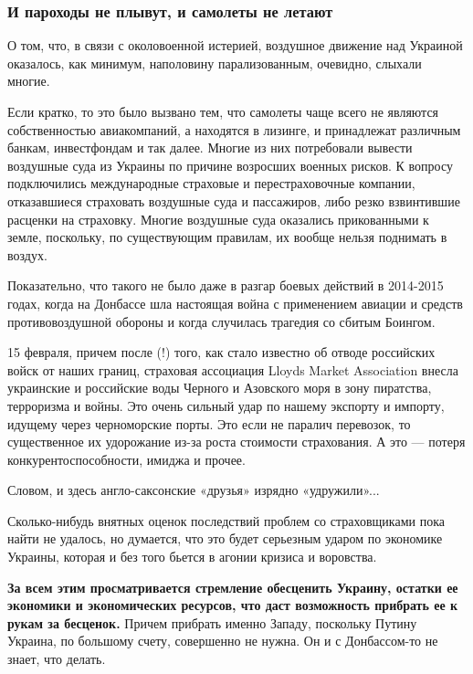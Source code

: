  
 
 
 
 

\subsubsection{И пароходы не плывут, и самолеты не летают}

О том, что, в связи с околовоенной истерией, воздушное движение над Украиной
оказалось, как минимум, наполовину парализованным, очевидно, слыхали многие.

Если кратко, то это было вызвано тем, что самолеты чаще всего не являются
собственностью авиакомпаний, а находятся в лизинге, и принадлежат различным
банкам, инвестфондам и так далее. Многие из них потребовали вывести воздушные
суда из Украины по причине возросших военных рисков. К вопросу подключились
международные страховые и перестраховочные компании, отказавшиеся страховать
воздушные суда и пассажиров, либо резко взвинтившие расценки на страховку.
Многие воздушные суда оказались прикованными к земле, поскольку, по
существующим правилам, их вообще нельзя поднимать в воздух.

Показательно, что такого не было даже в разгар боевых действий в 2014-2015
годах, когда на Донбассе шла настоящая война с применением авиации и средств
противовоздушной обороны и когда случилась трагедия со сбитым Боингом.

15 февраля, причем после (!) того, как стало известно об отводе российских
войск от наших границ, страховая ассоциация Lloyds Market Association внесла
украинские и российские воды Черного и Азовского моря в зону пиратства,
терроризма и войны. Это очень сильный удар по нашему экспорту и импорту,
идущему через черноморские порты. Это если не паралич перевозок, то
существенное их удорожание из-за роста стоимости страхования. А это — потеря
конкурентоспособности, имиджа и прочее.

Словом, и здесь англо-саксонские «друзья» изрядно «удружили»...

Сколько-нибудь внятных оценок последствий проблем со страховщиками пока найти
не удалось, но думается, что это будет серьезным ударом по экономике Украины,
которая и без того бьется в агонии кризиса и воровства.

\textbf{За всем этим просматривается стремление обесценить Украину, остатки ее
экономики и экономических ресурсов, что даст возможность прибрать ее к рукам за
бесценок.} Причем прибрать именно Западу, поскольку Путину Украина, по большому
счету, совершенно не нужна. Он и с Донбассом-то не знает, что делать.

